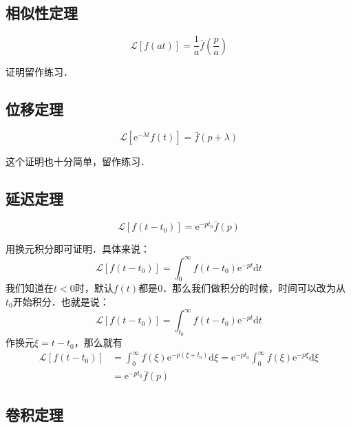 \subsection{相似性定理}
\begin{equation}
\mathscr{L}[f(at)]=\frac{1}{a} \bar{f}\left(\frac{p}{a}\right)
\end{equation}

证明留作练习．

\subsection{位移定理}
\begin{equation}
\mathscr{L}[\mathrm{e}^{-\lambda t} f(t)]= \bar{f}(p+\lambda)
\end{equation}

这个证明也十分简单，留作练习．

\subsection{延迟定理}
\begin{equation}
\mathscr{L}\left [f\left(t-t_{0}\right)\right] =\mathrm{e}^{-p t_{0}} \bar f(p)
\end{equation}

用换元积分即可证明．具体来说：
\begin{equation}
\mathscr L\left [f\left(t-t_{0}\right)\right] =\int_{0}^{\infty} f\left(t-t_{0}\right) \mathrm{e}^{-p t} \mathrm{d} t
\end{equation}
我们知道在$t<0$时，默认$f(t)$都是$0$．那么我们做积分的时候，时间可以改为从$t_0$开始积分．也就是说：
\begin{equation}
\mathscr L\left [f\left(t-t_{0}\right)\right] =\int_{t_0}^{\infty} f\left(t-t_{0}\right) \mathrm{e}^{-p t} \mathrm{d} t
\end{equation}
作换元$\xi=t-t_0$，那么就有
\begin{equation}
\begin{aligned} \mathscr L\left[f\left(t-t_{0}\right)\right] &=\int_{0}^{\infty} f(\xi) \mathrm{e}^{-p\left(\xi+t_{0}\right)} \mathrm{d} \xi=\mathrm{e}^{-p t_{0}} \int_{0}^{\infty} f(\xi) \mathrm{e}^{-p \xi} \mathrm{d} \xi \\ &=\mathrm{e}^{-p t_{0}} \bar{f}(p) \end{aligned}
\end{equation}

\subsection{卷积定理}

